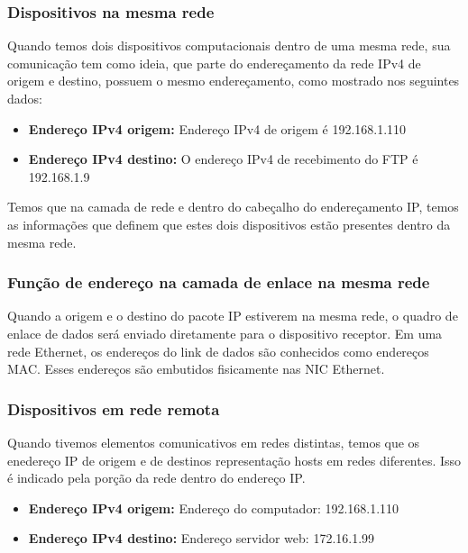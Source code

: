 \documentclass[12pt a4paper]{paper}
\begin{document}
\subsubsection{Dispositivos na mesma rede} %
\label{sec:Dispositivos na mesma rede}
Quando temos dois dispositivos computacionais dentro de uma mesma rede, sua 
comunicação tem como ideia, que parte do endereçamento da rede IPv4 de origem e 
destino, possuem o mesmo endereçamento, como mostrado nos seguintes dados: 

\begin{itemize}
  \item \textbf{Endereço IPv4 origem: } Endereço IPv4 de origem é 192.168.1.110
  \item \textbf{Endereço IPv4 destino: }O endereço IPv4 de recebimento do FTP é 192.168.1.9
\end{itemize}

Temos que na camada de rede e dentro do cabeçalho do endereçamento IP, temos as 
informações que definem que estes dois dispositivos estão presentes dentro da 
mesma rede. 

\subsubsection{Função de endereço na camada de enlace na mesma rede} %
\label{sec:Função de endereço na camada de enlace na mesma rede}
Quando a origem e o destino do pacote IP estiverem na mesma rede, o quadro de enlace 
de dados será enviado diretamente para o dispositivo receptor. Em uma rede Ethernet, 
os endereços do link de dados são conhecidos como endereços MAC. Esses endereços são 
embutidos fisicamente nas NIC Ethernet. 


\subsubsection{Dispositivos em rede remota} %
\label{sec:Dispositivos em rede remota}
Quando tivemos elementos comunicativos em redes distintas, temos que os enedereço 
IP de origem e de destinos representação hosts em redes diferentes. Isso é indicado 
pela porção da rede dentro do endereço IP. 

\begin{itemize}
  \item \textbf{Endereço IPv4 origem: } Endereço do computador: 192.168.1.110
  \item \textbf{Endereço IPv4 destino: } Endereço servidor web: 172.16.1.99
\end{itemize}
\end{document}
